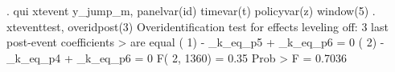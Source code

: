 . qui xtevent y_jump_m, panelvar(id) timevar(t) policyvar(z) window(5)
{\smallskip}
. xteventtest, overidpost(3)
{\smallskip}
Overidentification test for effects leveling off: 3 last post-event coefficients 
> are equal
{\smallskip}
 ( 1)  - _k_eq_p5 + _k_eq_p6 = 0
 ( 2)  - _k_eq_p4 + _k_eq_p6 = 0
{\smallskip}
       F(  2,  1360) =    0.35
            Prob > F =    0.7036
{\smallskip}
